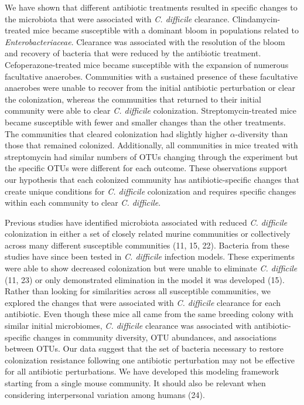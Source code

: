 \documentclass[11pt,]{article}
\begin{document}
We have shown that different antibiotic treatments resulted in specific
changes to the microbiota that were associated with \emph{C. difficile}
clearance. Clindamycin-treated mice became susceptible with a dominant
bloom in populations related to \emph{Enterobacteriaceae}. Clearance was
associated with the resolution of the bloom and recovery of bacteria
that were reduced by the antibiotic treatment. Cefoperazone-treated mice
became susceptible with the expansion of numerous facultative anaerobes.
Communities with a sustained presence of these facultative anaerobes
were unable to recover from the initial antibiotic perturbation or clear
the colonization, whereas the communities that returned to their initial
community were able to clear \emph{C. difficile} colonization.
Streptomycin-treated mice became susceptible with fewer and smaller
changes than the other treatments. The communities that cleared
colonization had slightly higher \(\alpha\)-diversity than those that
remained colonized. Additionally, all communities in mice treated with
streptomycin had similar numbers of OTUs changing through the experiment
but the specific OTUs were different for each outcome. These
observations support our hypothesis that each colonized community has
antibiotic-specific changes that create unique conditions for \emph{C.
difficile} colonization and requires specific changes within each
community to clear \emph{C. difficile}.

Previous studies have identified microbiota associated with reduced
\emph{C. difficile} colonization in either a set of closely related
murine communities or collectively across many different susceptible
communities (11, 15, 22). Bacteria from these studies have since been
tested in \emph{C. difficile} infection models. These experiments were
able to show decreased colonization but were unable to eliminate
\emph{C. difficile} (11, 23) or only demonstrated elimination in the
model it was developed (15). Rather than looking for similarities across
all susceptible communities, we explored the changes that were
associated with \emph{C. difficile} clearance for each antibiotic. Even
though these mice all came from the same breeding colony with similar
initial microbiomes, \emph{C. difficile} clearance was associated with
antibiotic-specific changes in community diversity, OTU abundances, and
associations between OTUs. Our data suggest that the set of bacteria
necessary to restore colonization resistance following one antibiotic
perturbation may not be effective for all antibiotic perturbations. We
have developed this modeling framework starting from a single mouse
community. It should also be relevant when considering interpersonal
variation among humans (24).
\end{document}

